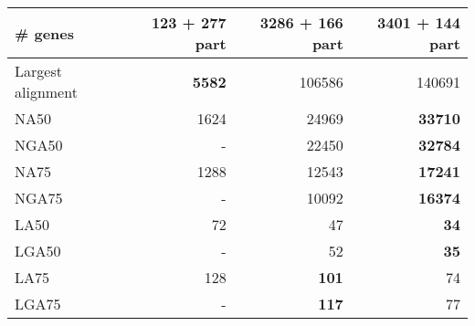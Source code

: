 \documentclass[12pt,a4paper]{article}
\begin{document}
\begin{table}[ht]
\begin{center}
\begin{tabular}{|l*{3}{|r}|}
\# genes & 123 + 277 part & 3286 + 166 part & {\bf 3401 + 144 part} \\ \hline
Largest alignment & {\bf 5582} & 106586 & 140691 \\ \hline
NA50 & 1624 & 24969 & {\bf 33710} \\ \hline
NGA50 & - & 22450 & {\bf 32784} \\ \hline
NA75 & 1288 & 12543 & {\bf 17241} \\ \hline
NGA75 & - & 10092 & {\bf 16374} \\ \hline
LA50 & 72 & 47 & {\bf 34} \\ \hline
LGA50 & - & 52 & {\bf 35} \\ \hline
LA75 & 128 & {\bf 101} & 74 \\ \hline
LGA75 & - & {\bf 117} & 77 \\ \hline
\end{tabular}
\end{center}
\end{table}
\end{document}

